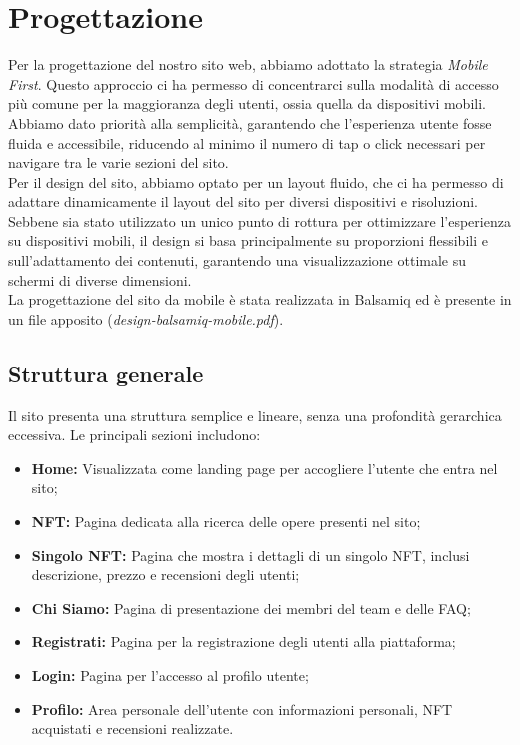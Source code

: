 \documentclass[10pt]{article}
\begin{document}
\section{Progettazione}
Per la progettazione del nostro sito web, abbiamo adottato la strategia \textit{Mobile First}. Questo approccio ci ha permesso di concentrarci sulla modalità di accesso più comune per la maggioranza degli utenti, ossia quella da dispositivi mobili. Abbiamo dato priorità alla semplicità, garantendo che l’esperienza utente fosse fluida e accessibile, riducendo al minimo il numero di tap o click necessari per navigare tra le varie sezioni del sito.\\
Per il design del sito, abbiamo optato per un layout fluido, che ci ha permesso di adattare dinamicamente il layout del sito per diversi dispositivi e risoluzioni. Sebbene sia stato utilizzato un unico punto di rottura per ottimizzare l’esperienza su dispositivi mobili, il design si basa principalmente su proporzioni flessibili e sull’adattamento dei contenuti, garantendo una visualizzazione ottimale su schermi di diverse dimensioni. \\
La progettazione del sito da mobile è stata realizzata in Balsamiq ed è presente in un file apposito (\textit{design-balsamiq-mobile.pdf}).

\subsection{Struttura generale}
Il sito presenta una struttura semplice e lineare, senza una profondità gerarchica eccessiva. Le principali sezioni includono:
\begin{itemize}
\item \textbf{Home:} Visualizzata come landing page per accogliere l'utente che entra nel sito;
\item \textbf{NFT:} Pagina dedicata alla ricerca delle opere presenti nel sito;
\item \textbf{Singolo NFT:} Pagina che mostra i dettagli di un singolo NFT, inclusi descrizione, prezzo e recensioni degli utenti;
\item \textbf{Chi Siamo:} Pagina di presentazione dei membri del team e delle FAQ;
\item \textbf{Registrati:} Pagina per la registrazione degli utenti alla piattaforma;
\item \textbf{Login:} Pagina per l'accesso al profilo utente;
\item \textbf{Profilo:} Area personale dell'utente con informazioni personali, NFT acquistati e recensioni realizzate.
\end{itemize}
\end{document}
